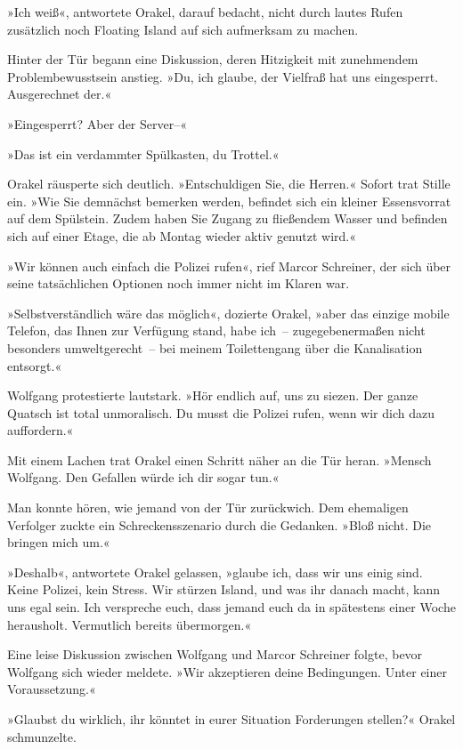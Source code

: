 »Ich weiß«, antwortete Orakel, darauf bedacht, nicht durch lautes Rufen zusätzlich noch Floating Island auf sich aufmerksam zu machen.

Hinter der Tür begann eine Diskussion, deren Hitzigkeit mit zunehmendem Problembewusstsein anstieg. »Du, ich glaube, der Vielfraß hat uns eingesperrt. Ausgerechnet der.«

»Eingesperrt? Aber der Server–«

»Das ist ein verdammter Spülkasten, du Trottel.«

Orakel räusperte sich deutlich. »Entschuldigen Sie, die Herren.« Sofort trat Stille ein. »Wie Sie demnächst bemerken werden, befindet sich ein kleiner Essensvorrat auf dem Spülstein. Zudem haben Sie Zugang zu fließendem Wasser und befinden sich auf einer Etage, die ab Montag wieder aktiv genutzt wird.«

»Wir können auch einfach die Polizei rufen«, rief Marcor Schreiner, der sich über seine tatsächlichen Optionen noch immer nicht im Klaren war.

»Selbstverständlich wäre das möglich«, dozierte Orakel, »aber das einzige mobile Telefon, das Ihnen zur Verfügung stand, habe ich~– zugegebenermaßen nicht besonders umweltgerecht~– bei meinem Toilettengang über die Kanalisation entsorgt.«

Wolfgang protestierte lautstark. »Hör endlich auf, uns zu siezen. Der ganze Quatsch ist total unmoralisch. Du musst die Polizei rufen, wenn wir dich dazu auffordern.«

Mit einem Lachen trat Orakel einen Schritt näher an die Tür heran. »Mensch Wolfgang. Den Gefallen würde ich dir sogar tun.«

Man konnte hören, wie jemand von der Tür zurückwich. Dem ehemaligen Verfolger zuckte ein Schreckensszenario durch die Gedanken. »Bloß nicht. Die bringen mich um.«

»Deshalb«, antwortete Orakel gelassen, »glaube ich, dass wir uns einig sind. Keine Polizei, kein Stress. Wir stürzen Island, und was ihr danach macht, kann uns egal sein. Ich verspreche euch, dass jemand euch da in spätestens einer Woche herausholt. Vermutlich bereits übermorgen.«

Eine leise Diskussion zwischen Wolfgang und Marcor Schreiner folgte, bevor Wolfgang sich wieder meldete. »Wir akzeptieren deine Bedingungen. Unter einer Voraussetzung.«

»Glaubst du wirklich, ihr könntet in eurer Situation Forderungen stellen?« Orakel schmunzelte.

